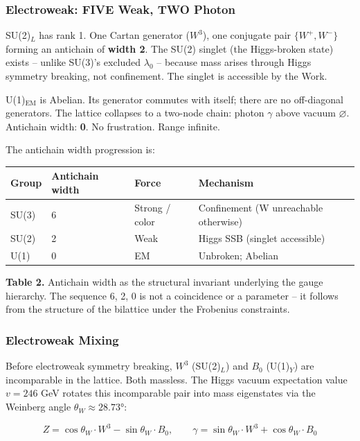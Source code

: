 \documentclass[12pt,a4paper]{article}
\begin{document}
\hypertarget{electroweak-five-weak-two-photon}{%
\subsubsection{Electroweak: FIVE Weak, TWO
Photon}\label{electroweak-five-weak-two-photon}}

SU(2)\(_L\) has rank 1. One Cartan generator (\(W^3\)), one conjugate
pair \(\{W^+, W^-\}\) forming an antichain of \textbf{width 2}. The
SU(2) singlet (the Higgs-broken state) exists -- unlike SU(3)'s excluded
\(\lambda_0\) -- because mass arises through Higgs symmetry breaking,
not confinement. The singlet is accessible by the Work.

U(1)\(_\text{EM}\) is Abelian. Its generator commutes with itself; there
are no off-diagonal generators. The lattice collapses to a two-node
chain: photon \(\gamma\) above vacuum \(\varnothing\). Antichain width:
\textbf{0}. No frustration. Range infinite.

The antichain width progression is:

\begin{longtable}[]{@{}llll@{}}
\toprule
Group & Antichain width & Force & Mechanism\tabularnewline
\midrule
\endhead
SU(3) & 6 & Strong / color & Confinement (W unreachable
otherwise)\tabularnewline
SU(2) & 2 & Weak & Higgs SSB (singlet accessible)\tabularnewline
U(1) & 0 & EM & Unbroken; Abelian\tabularnewline
\bottomrule
\end{longtable}

\textbf{Table 2.} Antichain width as the structural invariant underlying
the gauge hierarchy. The sequence 6, 2, 0 is not a coincidence or a
parameter -- it follows from the structure of the bilattice under the
Frobenius constraints.

\hypertarget{electroweak-mixing}{%
\subsubsection{Electroweak Mixing}\label{electroweak-mixing}}

Before electroweak symmetry breaking, \(W^3\) (SU(2)\(_L\)) and \(B_0\)
(U(1)\(_Y\)) are incomparable in the lattice. Both massless. The Higgs
vacuum expectation value \(v = 246\) GeV rotates this incomparable pair
into mass eigenstates via the Weinberg angle
\(\theta_W \approx 28.73°\):

\[Z = \cos\theta_W \cdot W^3 - \sin\theta_W \cdot B_0, \qquad
\gamma = \sin\theta_W \cdot W^3 + \cos\theta_W \cdot B_0\]
\end{document}
